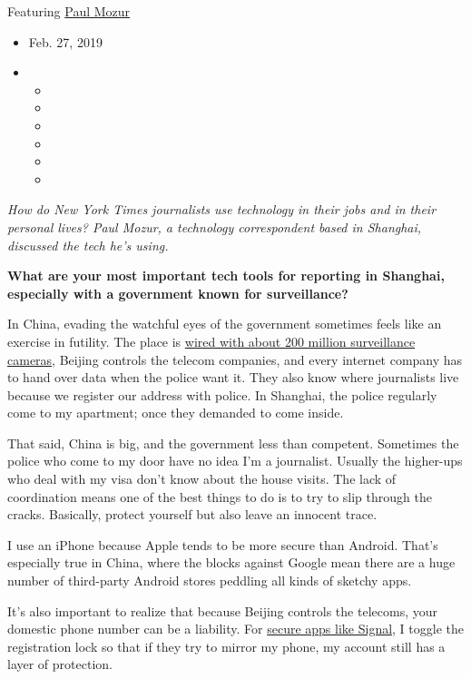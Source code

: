 Featuring \href{https://www.nytimes3xbfgragh.onion/by/paul-mozur}{Paul
Mozur}

\begin{itemize}
\item
  Feb. 27, 2019
\item
  \begin{itemize}
  \item
  \item
  \item
  \item
  \item
  \item
  \end{itemize}
\end{itemize}

\emph{How do New York Times journalists use technology in their jobs and
in their personal lives? Paul Mozur, a technology correspondent based in
Shanghai, discussed the tech he's using.}

\textbf{What are your most important tech tools for reporting in
Shanghai, especially with a government known for surveillance?}

In China, evading the watchful eyes of the government sometimes feels
like an exercise in futility. The place is
\href{https://www.nytimes3xbfgragh.onion/2018/07/08/business/china-surveillance-technology.html}{wired
with about 200 million surveillance cameras}, Beijing controls the
telecom companies, and every internet company has to hand over data when
the police want it. They also know where journalists live because we
register our address with police. In Shanghai, the police regularly come
to my apartment; once they demanded to come inside.

That said, China is big, and the government less than competent.
Sometimes the police who come to my door have no idea I'm a journalist.
Usually the higher-ups who deal with my visa don't know about the house
visits. The lack of coordination means one of the best things to do is
to try to slip through the cracks. Basically, protect yourself but also
leave an innocent trace.

I use an iPhone because Apple tends to be more secure than Android.
That's especially true in China, where the blocks against Google mean
there are a huge number of third-party Android stores peddling all kinds
of sketchy apps.

It's also important to realize that because Beijing controls the
telecoms, your domestic phone number can be a liability. For
\href{https://www.nytimes3xbfgragh.onion/2016/12/07/technology/personaltech/worried-about-the-privacy-of-your-messages-download-signal.html}{secure
apps like Signal}, I toggle the registration lock so that if they try to
mirror my phone, my account still has a layer of protection.

